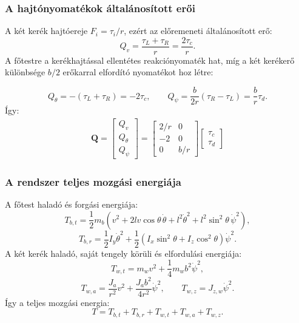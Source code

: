 \documentclass[12pt,a4paper]{report}
\begin{document}
	\subsubsection{A hajtónyomatékok általánosított erői}
	A két kerék hajtóereje \(F_i=\tau_i/r\), ezért az előremeneti általánosított erő:
	\begin{equation}
		Q_v=\frac{\tau_L+\tau_R}{r}
		=\frac{2\tau_c}{r}.
	\end{equation}
	A főtestre a kerékhajtással ellentétes reakciónyomaték hat, míg a két kerékerő különbsége \(b/2\) erőkarral elfordító nyomatékot hoz létre:
	
	\begin{equation}
	Q_\theta=-(\tau_L+\tau_R)=-2\tau_c,
	\qquad
	Q_\psi=\frac{b}{2r}(\tau_R-\tau_L)=\frac br\tau_d.
	\end{equation}
	Így:
	\begin{equation}
		\boxed{\begin{gathered}
				\mathbf Q=
				\begin{bmatrix}
					Q_v\\Q_\theta\\Q_\psi
				\end{bmatrix}
				=
				\begin{bmatrix}
					2/r&0\\
					-2&0\\
					0&b/r
				\end{bmatrix}
				\begin{bmatrix}
					\tau_c\\
					\tau_d
				\end{bmatrix}
		\end{gathered}}
	\end{equation}
	
	\subsubsection{A rendszer teljes mozgási energiája}
	A főtest haladó és forgási energiája:
	\begin{equation}
	T_{b,t}
	=
	\frac12m_b
	\left(
	v^2+2lv\cos\theta\,\dot\theta+l^2\dot\theta^2
	+l^2\sin^2\theta\,\dot\psi^2
	\right),
	\end{equation}
	\begin{equation}
	T_{b,r}
	=
	\frac12I_y\dot\theta^2
	+
	\frac12
	\left(I_x\sin^2\theta+I_z\cos^2\theta\right)
	\dot\psi^2.
	\end{equation}
	A két kerék haladó, saját tengely körüli és elfordulási energiája:
	\begin{equation}
	T_{w,t}
	=
	m_wv^2+\frac14m_wb^2\dot\psi^2,
	\end{equation}
	\begin{equation}
	T_{w,a}
	=
	\frac{J_a}{r^2}v^2
	+
	\frac{J_ab^2}{4r^2}\dot\psi^2,
	\qquad
	T_{w,z}
	=
	J_{z,w}\dot\psi^2.
	\end{equation}
	Így a teljes mozgási energia:
	\begin{equation}
	\boxed{
		T=T_{b,t}+T_{b,r}+T_{w,t}+T_{w,a}+T_{w,z}.
	}
	\end{equation}
\end{document}
